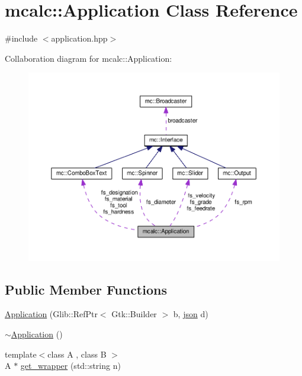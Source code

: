 \hypertarget{classmcalc_1_1Application}{}\section{mcalc\+:\+:Application Class Reference}
\label{classmcalc_1_1Application}


{\ttfamily \#include $<$application.\+hpp$>$}



Collaboration diagram for mcalc\+:\+:Application\+:\nopagebreak
\begin{figure}[H]
\begin{center}
\leavevmode
\includegraphics[width=350pt]{classmcalc_1_1Application__coll__graph}
\end{center}
\end{figure}
\subsection*{Public Member Functions}
\begin{DoxyCompactItemize}
\item 
\hyperlink{classmcalc_1_1Application_a44bc4c3091df2f37d9c5c5773d18de59}{Application} (Glib\+::\+Ref\+Ptr$<$ Gtk\+::\+Builder $>$ b, \hyperlink{application_8hpp_ab701e3ac61a85b337ec5c1abaad6742d}{json} d)
\item 
\hyperlink{classmcalc_1_1Application_a74e71090e2ccb489e865fd55875c36bf}{$\sim$\+Application} ()
\item 
{\footnotesize template$<$class A , class B $>$ }\\A $\ast$ \hyperlink{classmcalc_1_1Application_a11b823b5d31e917b83e97806bcbbcb18}{get\+\_\+wrapper} (std\+::string n)
\end{DoxyCompactItemize}
